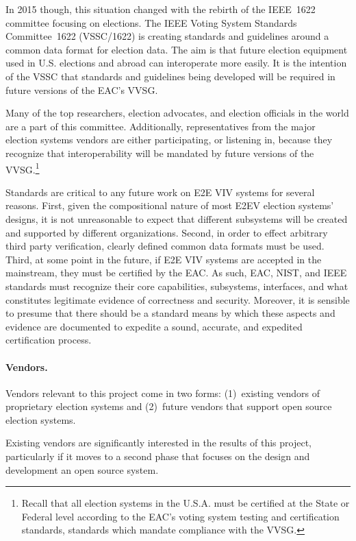 In 2015 though, this situation changed with the rebirth of the
IEEE~1622 committee focusing on elections. The IEEE Voting System
Standards Committee~1622 (VSSC/1622) is creating standards and
guidelines around a common data format for election data. The aim is
that future election equipment used in U.S. elections and abroad can
interoperate more easily. It is the intention of the VSSC that
standards and guidelines being developed will be required in future
versions of the EAC's VVSG.

Many of the top researchers, election advocates, and election
officials in the world are a part of this committee. Additionally,
representatives from the major election systems vendors are either
participating, or listening in, because they recognize that
interoperability will be mandated by future versions of the
VVSG.\footnote{Recall that all election systems in the U.S.A. must be
  certified at the State or Federal level according to the EAC's
  voting system testing and certification standards, standards which
  mandate compliance with the VVSG.}

Standards are critical to any future work on E2E VIV systems for
several reasons.  First, given the compositional nature of most E2EV
election systems' designs, it is not unreasonable to expect that
different subsystems will be created and supported by different
organizations.  Second, in order to effect arbitrary third party
verification, clearly defined common data formats must be used.
Third, at some point in the future, if E2E VIV systems are accepted in
the mainstream, they must be certified by the EAC.  As such, EAC,
NIST, and IEEE standards must recognize their core capabilities,
subsystems, interfaces, and what constitutes legitimate evidence of
correctness and security. Moreover, it is sensible to presume that
there should be a standard means by which these aspects and evidence
are documented to expedite a sound, accurate, and expedited
certification process.

\paragraph{Vendors.} Vendors relevant to this project come in two
forms: (1)~existing vendors of proprietary election systems and
(2)~future vendors that support open source election systems.

Existing vendors are significantly interested in the results of this
project, particularly if it moves to a second phase that focuses on
the design and development an open source system.


